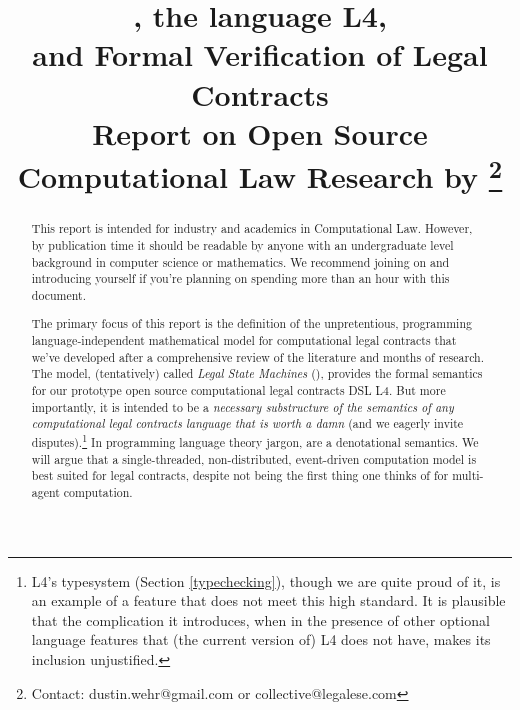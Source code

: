 \documentclass[12pt]{article}
\title{\lsmslong, the language L4,\\
and Formal Verification of Legal Contracts \\
\smaller \smaller Report on Open Source Computational Law Research by \extlink{https://legalese.com}{Legalese}\footnote{Contact: dustin.wehr@gmail.com or collective@legalese.com}\larger \larger }
\newcommand{\termz}[2]{\EM{\textsf{\hyperref[#1]{#2}}}\xspace}
\newcommand{\lsmslong}{Legal State Machines\xspace}
\newcommand{\lsms}{\texorpdfstring{\termz{lsm}{LSMs}}{LSMs}}
\begin{document}
\maketitle

\begin{abstract}
This report is intended for industry and academics in Computational Law. However, by publication time it should be readable by anyone with an undergraduate level background in computer science or mathematics. We recommend joining  on  and introducing yourself if you're planning on spending more than an hour with this document. %

The primary focus of this report is the definition of the unpretentious, programming language-independent mathematical model for computational legal contracts that we've developed after a comprehensive review of the literature and months of research. The model, (tentatively) called \textit{\lsmslong} (\lsms), provides the formal semantics for our prototype open source computational legal contracts DSL L4. But more importantly, it is intended to be a \textit{necessary substructure of the semantics of any computational legal contracts language that is worth a damn} (and we eagerly invite disputes).\footnote{L4's typesystem (Section \ref{typechecking}), though we are quite proud of it, is an example of a feature that does not meet this high standard. It is plausible that the complication it introduces, when in the presence of other optional language features that (the current version of) L4 does not have, makes its inclusion unjustified.}
In programming language theory jargon, \lsms are a denotational semantics. We will argue that a single-threaded, non-distributed, event-driven computation model is best suited for legal contracts, despite not being the first thing one thinks of for multi-agent computation.
\end{abstract}
\pagebreak
\end{document}
